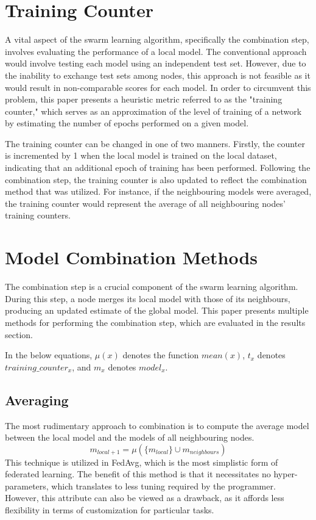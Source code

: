 \section{Training Counter}
A vital aspect of the swarm learning algorithm, specifically the combination step, involves evaluating the performance of a local model. The conventional approach would involve testing each model using an independent test set. However, due to the inability to exchange test sets among nodes, this approach is not feasible as it would result in non-comparable scores for each model. In order to circumvent this problem, this paper presents a heuristic metric referred to as the "training counter," which serves as an approximation of the level of training of a network by estimating the number of epochs performed on a given model.

The training counter can be changed in one of two manners. Firstly, the counter is incremented by 1 when the local model is trained on the local dataset, indicating that an additional epoch of training has been performed. Following the combination step, the training counter is also updated to reflect the combination method that was utilized. For instance, if the neighbouring models were averaged, the training counter would represent the average of all neighbouring nodes' training counters.

\section{Model Combination Methods}
The combination step is a crucial component of the swarm learning algorithm. During this step, a node merges its local model with those of its neighbours, producing an updated estimate of the global model. This paper presents multiple methods for performing the combination step, which are evaluated in the results section.

In the below equations, $\mu(x)$ denotes the function $mean(x)$, $t_x$ denotes $training\_counter_x$, and $m_x$ denotes $model_x$.

\subsection{Averaging}
The most rudimentary approach to combination is to compute the average model between the local model and the models of all neighbouring nodes.
\[ m_{local+1} = \mu ( \{ m_{local} \} \cup m_{neighbours} )\]
This technique is utilized in FedAvg, which is the most simplistic form of federated learning. The benefit of this method is that it necessitates no hyper-parameters, which translates to less tuning required by the programmer. However, this attribute can also be viewed as a drawback, as it affords less flexibility in terms of customization for particular tasks.

